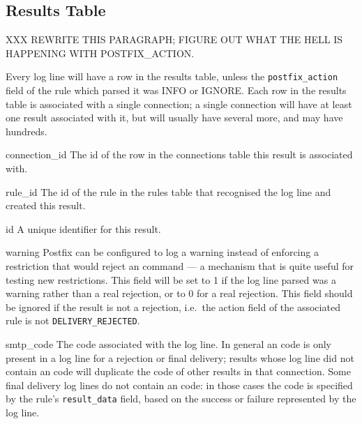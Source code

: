 \subsection{Results Table}

\label{results table}

XXX REWRITE THIS PARAGRAPH\@; FIGURE OUT WHAT THE HELL IS HAPPENING WITH
POSTFIX\_ACTION\@.

Every log line will have a row in the results table, unless the \newline{}
\texttt{postfix\_action} field of the rule which parsed it was INFO or
IGNORE\@.  Each row in the results table is associated with a single
connection; a single connection will have at least one result associated
with it, but will usually have several more, and may have hundreds.

\begin{boldeqlist}

    \item [connection\_id] The id of the row in the connections table this
        result is associated with.

    \item [rule\_id] The id of the rule in the rules table that recognised
        the log line and created this result.

    \item [id] A unique identifier for this result.

    \item [warning] Postfix can be configured to log a warning instead of
        enforcing a restriction that would reject an  command
        --- a mechanism that is quite useful for testing new restrictions.
        This field will be set to 1 if the log line parsed was a warning rather
        than a real rejection, or to 0 for a real rejection.  This field
        should be ignored if the result is not a rejection, i.e.\ the
        action field of the associated rule is not
        \texttt{DELIVERY\_REJECTED}.

    \item [smtp\_code] The  code associated with the log
        line.  In general an  code is only present in a log
        line for a rejection or final delivery; results whose log line did
        not contain an  code will duplicate the
         code of other results in that connection.  Some
        final delivery log lines do not contain an  code: in
        those cases the  code is specified by the rule's
        \texttt{result\_data} field, based on the success or failure
        represented by the log line.


\end{boldeqlist}
